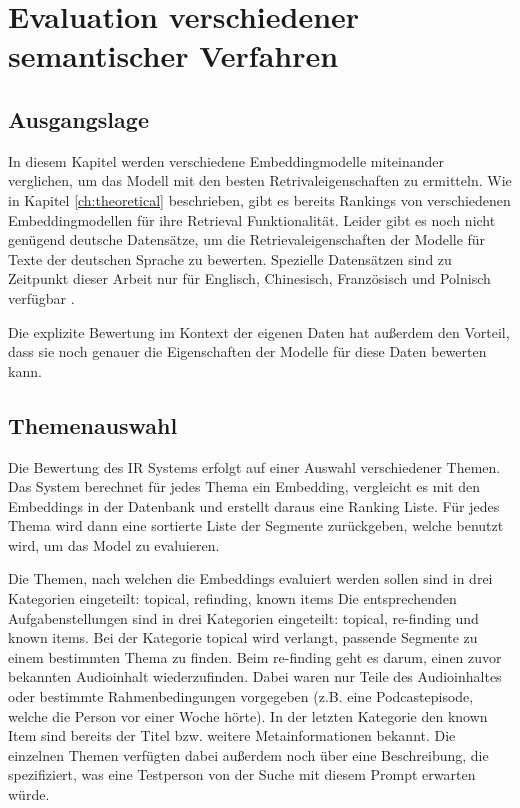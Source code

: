 \chapter{Evaluation verschiedener semantischer Verfahren}\label{ch:experiments}

\section{Ausgangslage}

In diesem Kapitel werden verschiedene Embeddingmodelle miteinander verglichen, um das Modell mit den besten Retrivaleigenschaften zu ermitteln.
Wie in Kapitel \autoref*{ch:theoretical} beschrieben, gibt es bereits Rankings von verschiedenen Embeddingmodellen für ihre Retrieval Funktionalität.
Leider gibt es noch nicht genügend deutsche Datensätze, um die Retrievaleigenschaften der Modelle für Texte der deutschen Sprache zu bewerten.
Spezielle Datensätzen sind zu Zeitpunkt dieser Arbeit nur für Englisch, Chinesisch, Französisch und Polnisch verfügbar \cite{mteb}.

Die explizite Bewertung im Kontext der eigenen Daten hat außerdem den Vorteil, dass sie noch genauer die Eigenschaften der Modelle für diese Daten bewerten kann.

\section{Themenauswahl}

Die Bewertung des IR Systems erfolgt auf einer Auswahl verschiedener Themen.
Das System berechnet für jedes Thema ein Embedding, vergleicht es mit den Embeddings in der Datenbank und erstellt daraus eine Ranking Liste.
Für jedes Thema wird dann eine sortierte Liste der Segmente zurückgeben, welche benutzt wird, um das Model zu evaluieren.

Die Themen, nach welchen die Embeddings evaluiert werden sollen sind in drei Kategorien eingeteilt:
topical, refinding, known items \cite{jones2021}
Die entsprechenden Aufgabenstellungen sind in drei Kategorien eingeteilt: topical, re-finding und known items.
Bei der Kategorie topical wird verlangt, passende Segmente zu einem bestimmten Thema zu finden.
Beim re-finding geht es darum, einen zuvor bekannten Audioinhalt wiederzufinden.
Dabei waren nur Teile des Audioinhaltes oder bestimmte Rahmenbedingungen vorgegeben (z.B. eine Podcastepisode, welche die Person vor einer Woche hörte).
In der letzten Kategorie den known Item sind bereits der Titel bzw. weitere Metainformationen bekannt.
Die einzelnen Themen verfügten dabei außerdem noch über eine Beschreibung, die spezifiziert, was eine Testperson von der Suche mit diesem Prompt erwarten würde.


